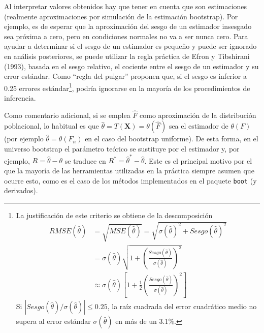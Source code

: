 \documentclass[
]{book}
\renewcommand{\mathbf}[1]{\symbf{#1}}
\theoremstyle{break}
\theoremstyle{nonumberplain}
\let\oldfootnote\footnote
\renewcommand\footnote[1]{\oldfootnote{\hspace{2mm}#1}}
\begin{document}
Al interpretar valores obtenidos hay que tener en cuenta que son estimaciones (realmente aproximaciones por simulación de la estimación bootstrap).
Por ejemplo, es de esperar que la aproximación del sesgo de un estimador insesgado sea próxima a cero, pero en condiciones normales no va a ser nunca cero.
Para ayudar a determinar si el sesgo de un estimador es pequeño y puede ser ignorado en análisis posteriores, se puede utilizar la regla práctica de Efron y Tibshirani (1993), basada en el sesgo relativo, el cociente entre el sesgo de un estimador y su error estándar.
Como ``regla del pulgar'' proponen que, si el sesgo es inferior a 0.25 errores estándar\footnote{La justificación de este criterio se obtiene de la descomposición
  \[\begin{aligned}
  RMSE(\hat\theta) &= \sqrt{MSE(\hat\theta)} = \sqrt{\sigma(\hat\theta)^2 + Sesgo(\hat\theta)^2} \\
  &= \sigma(\hat\theta) \sqrt{1 + \left( \frac{Sesgo(\hat\theta)}{\sigma(\hat\theta)} \right)^2} \\
  &\approx \sigma(\hat\theta) \left[ 1 + \frac{1}{2}\left( \frac{Sesgo(\hat\theta)}{\sigma(\hat\theta)} \right)^2\right]
  \end{aligned}\]
  Si \(|Sesgo(\hat\theta)/\sigma(\hat\theta)| \le 0.25\), la raíz cuadrada del error cuadrático medio no supera al error estándar \(\sigma(\hat\theta)\) en más de un 3.1\%.}, podría ignorarse en la mayoría de los procedimientos de inferencia.

Como comentario adicional, si se emplea \(\hat F\) como aproximación de la distribución poblacional, lo habitual es que \(\hat\theta = T\left( \mathbf{X} \right) = \theta ( \hat{F} )\) sea el estimador de \(\theta(F)\) (por ejemplo \(\hat\theta = \theta(F_n)\) en el caso del bootstrap uniforme).
De esta forma, en el universo bootstrap el parámetro teórico se sustituye por el estimador y, por ejemplo, \(R = \hat \theta - \theta\) se traduce en \(R^{\ast} = \hat{\theta}^{\ast}- \hat \theta\).
Este es el principal motivo por el que la mayoría de las herramientas utilizadas en la práctica siempre asumen que ocurre esto, como es el caso de los métodos implementados en el paquete \texttt{boot} (y derivados).
\end{document}
